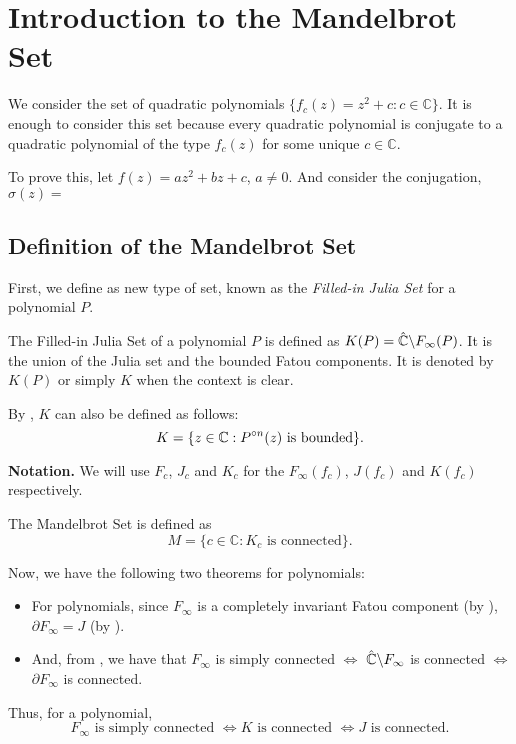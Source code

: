 \chapter{Introduction to the Mandelbrot Set}
We consider the set of quadratic polynomials \( \{f_c(z)=z^2+c:c\in \mathbb{C}\} \). It is
enough to consider this set because every quadratic polynomial is conjugate to a quadratic
polynomial of the type \( f_c(z) \) for some unique \( c\in \mathbb{C} \).

To prove this, let \( f(z)=az^2+bz+c \), \( a\neq 0 \). And consider the conjugation, \( \sigma(z)= \)

\section{Definition of the Mandelbrot Set}
First, we define as new type of set, known as the \emph{Filled-in Julia Set} for a polynomial \( P \).

\begin{definition}
The Filled-in Julia Set of a polynomial \( P \)	is defined as \( K(P)=\hat{\mathbb{C}}\backslash F_\infty(P) \). It
is the union of the Julia set and the bounded Fatou components.
It is denoted by \( K(P) \) or simply \( K \) when the context is clear.
\end{definition}
\noindent By , \( K \) can also be defined as follows:\[
	K=\{z\in \mathbb{C}:\pop[n](z)\text{ is bounded}\}
.\] 

\noindent \textbf{Notation.} We will use \( F_c \), \( J_c \) and \( K_c \) for the 
\( F_\infty(f_c) \), \( J(f_c) \) and \( K(f_c) \) respectively.

\begin{definition}
	The Mandelbrot Set is defined as \[ 
	M=\{c\in \mathbb{C}:K_c \text{ is connected}\}. 
\]
\end{definition}

\noindent Now, we have the following two theorems for polynomials:
\begin{itemize}
\item For polynomials, since \( F_\infty \) is a completely invariant Fatou component 
	(by ), \( \partial F_\infty=J \) (by ).
\item And, from , we have that \( F_\infty \) is simply connected \( \iff \)
	\( \hat{\mathbb{C}}\backslash F_\infty \) is connected \( \iff \) \( \partial F_\infty \) is connected.
\end{itemize}
Thus, for a polynomial,\[
	F_\infty \text{ is simply connected } \iff K \text{ is connected } \iff J \text{ is connected}
.\]

